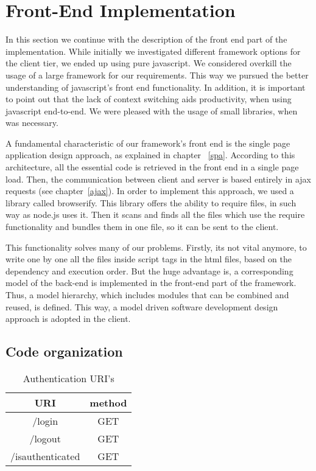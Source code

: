 \section{Front-End Implementation}
In this section we continue with the description of the front end part of the implementation. While initially we investigated different framework options for the client tier, we ended up using pure javascript. We considered overkill the usage of a large framework for our requirements. This way we pursued the better understanding of javascript's front end functionality. In addition, it is important to point out that the lack of context switching aids productivity, when using javascript end-to-end. We were pleased with the usage of small libraries, when was necessary. \par 
	A fundamental characteristic of our framework's front end is the single page application design approach, as explained in chapter ~\ref{spa}. According to this architecture, all the essential code is retrieved in the front end in a single page load. Then, the communication between client and server is based entirely in ajax requests (see chapter~\ref{ajax}). In order to implement this approach, we used a library called browserify. This library offers the ability to require files, in such way as node.js uses it. Then it scans and finds all the files which use the require functionality and bundles them in one file, so it can be sent to the client. \par
	This functionality solves many of our problems. Firstly, its not vital anymore, to write one by one all the files inside script tags in the html files, based on the dependency and execution order. But the huge advantage is, a corresponding model of the back-end is implemented in the front-end part of the framework. Thus, a model hierarchy, which includes modules that can be combined and reused, is defined. This way, a model driven software development design approach is adopted in the client.

\subsection{Code organization}




\begin{table}[]
\centering
\begin{tabular}{|c|c|}
\hline
\rowcolor[HTML]{32CB00} 
\textbf{URI}     & \textbf{method} \\ \hline
\rowcolor[HTML]{FFFFFF} 
/login           & GET             \\ \hline
\rowcolor[HTML]{67FD9A} 
/logout          & GET             \\ \hline
\rowcolor[HTML]{FFFFFF} 
/isauthenticated & GET             \\ \hline
\end{tabular}
\caption{Authentication URI's}
\label{authURI}
\end{table}


